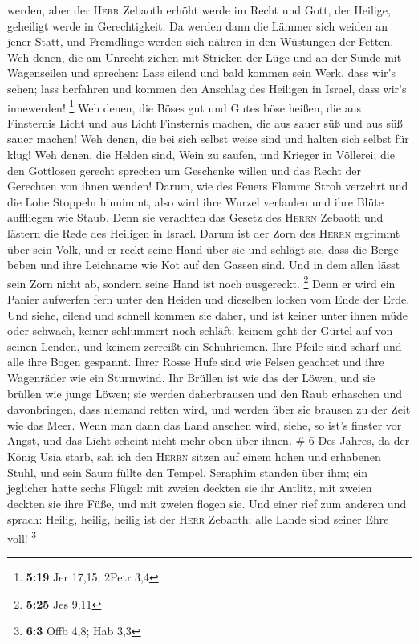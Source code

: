 werden,  aber der \textsc{Herr} Zebaoth erhöht werde im
Recht und Gott, der Heilige, geheiligt werde in Gerechtigkeit.
 Da werden dann die Lämmer sich weiden an jener Statt,
und Fremdlinge werden sich nähren in den Wüstungen der Fetten.
 Weh denen, die am Unrecht ziehen mit Stricken der Lüge
und an der Sünde mit Wagenseilen  und sprechen: Lass
eilend und bald kommen sein Werk, dass wir's sehen; lass herfahren und
kommen den Anschlag des Heiligen in Israel, dass wir's innewerden!
\footnote{\textbf{5:19} Jer 17,15; 2Petr 3,4}  Weh denen,
die Böses gut und Gutes böse heißen, die aus Finsternis Licht und aus
Licht Finsternis machen, die aus sauer süß und aus süß sauer machen!
 Weh denen, die bei sich selbst weise sind und halten
sich selbst für klug!  Weh denen, die Helden sind, Wein
zu saufen, und Krieger in Völlerei;  die den Gottlosen
gerecht sprechen um Geschenke willen und das Recht der Gerechten von
ihnen wenden!  Darum, wie des Feuers Flamme Stroh
verzehrt und die Lohe Stoppeln hinnimmt, also wird ihre Wurzel verfaulen
und ihre Blüte auffliegen wie Staub. Denn sie verachten das Gesetz des
\textsc{Herrn} Zebaoth und lästern die Rede des Heiligen in Israel.
 Darum ist der Zorn des \textsc{Herrn} ergrimmt über sein
Volk, und er reckt seine Hand über sie und schlägt sie, dass die Berge
beben und ihre Leichname wie Kot auf den Gassen sind. Und in dem allen
lässt sein Zorn nicht ab, sondern seine Hand ist noch ausgereckt.
\footnote{\textbf{5:25} Jes 9,11}  Denn er wird ein
Panier aufwerfen fern unter den Heiden und dieselben locken vom Ende der
Erde. Und siehe, eilend und schnell kommen sie daher, 
und ist keiner unter ihnen müde oder schwach, keiner schlummert noch
schläft; keinem geht der Gürtel auf von seinen Lenden, und keinem
zerreißt ein Schuhriemen.  Ihre Pfeile sind scharf und
alle ihre Bogen gespannt. Ihrer Rosse Hufe sind wie Felsen geachtet und
ihre Wagenräder wie ein Sturmwind.  Ihr Brüllen ist wie
das der Löwen, und sie brüllen wie junge Löwen; sie werden daherbrausen
und den Raub erhaschen und davonbringen, dass niemand retten wird,
 und werden über sie brausen zu der Zeit wie das Meer.
Wenn man dann das Land ansehen wird, siehe, so ist's finster vor Angst,
und das Licht scheint nicht mehr oben über ihnen. \# 6 
Des Jahres, da der König Usia starb, sah ich den \textsc{Herrn} sitzen
auf einem hohen und erhabenen Stuhl, und sein Saum füllte den Tempel.
 Seraphim standen über ihm; ein jeglicher hatte sechs
Flügel: mit zweien deckten sie ihr Antlitz, mit zweien deckten sie ihre
Füße, und mit zweien flogen sie.  Und einer rief zum
anderen und sprach: Heilig, heilig, heilig ist der \textsc{Herr}
Zebaoth; alle Lande sind seiner Ehre voll! \footnote{\textbf{6:3} Offb
  4,8; Hab 3,3}

